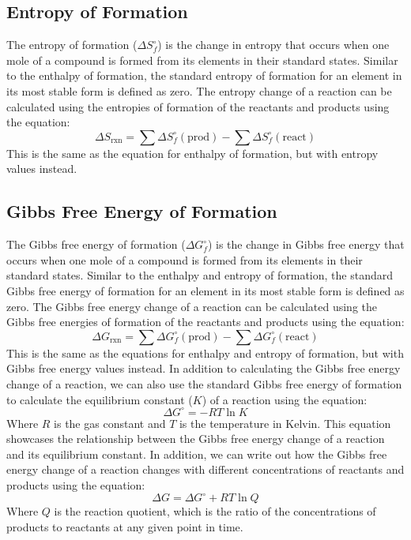 \subsection{Entropy of Formation}
The entropy of formation ($\Delta S_f^\circ$) is the change in entropy that occurs when one mole of a compound is formed from its elements in their standard states. Similar to the enthalpy of formation, the standard entropy of formation for an element in its most stable form is defined as zero. The entropy change of a reaction can be calculated using the entropies of formation of the reactants and products using the equation:
\begin{equation}\label{eq:entropy_of_formation}
    \Delta S_\text{rxn} = \sum \Delta S_f^\circ(\text{prod}) - \sum \Delta S_f^\circ (\text{react})
\end{equation}
This is the same as the equation for enthalpy of formation, but with entropy values instead.
\subsection{Gibbs Free Energy of Formation}
The Gibbs free energy of formation ($\Delta G_f^\circ$) is the change in Gibbs free energy that occurs when one mole of a compound is formed from its elements in their standard states. Similar to the enthalpy and entropy of formation, the standard Gibbs free energy of formation for an element in its most stable form is defined as zero. The Gibbs free energy change of a reaction can be calculated using the Gibbs free energies of formation of the reactants and products using the equation:
\begin{equation}\label{eq:free_energy_of_formation}
    \Delta G_\text{rxn} = \sum \Delta G_f^\circ(\text{prod}) - \sum \Delta G_f^\circ (\text{react})
\end{equation}
This is the same as the equations for enthalpy and entropy of formation, but with Gibbs free energy values instead. 
In addition to calculating the Gibbs free energy change of a reaction, we can also use the standard Gibbs free energy of formation to calculate the equilibrium constant ($K$) of a reaction using the equation:
\begin{equation}\label{eq:free_energy_equilibrium}
    \Delta G^\circ = -RT \ln{K}
\end{equation}
Where $R$ is the gas constant and $T$ is the temperature in Kelvin. This equation showcases the relationship between the Gibbs free energy change of a reaction and its equilibrium constant. In addition, we can write out how the Gibbs free energy change of a reaction changes with different concentrations of reactants and products using the equation:
\begin{equation}\label{eq:free_energy_concentration}
    \Delta G = \Delta G^\circ + RT \ln{Q}
\end{equation}
Where $Q$ is the reaction quotient, which is the ratio of the concentrations of products to reactants at any given point in time. 